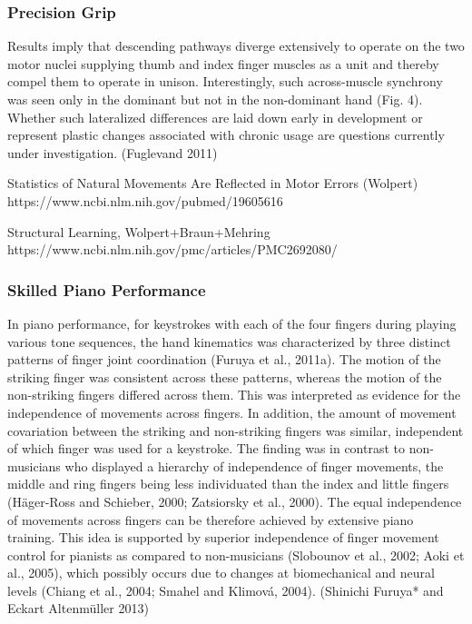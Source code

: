 {            \hypertarget{precision-grip}{%
            \subsubsection{Precision Grip}\label{precision-grip}}

            Results imply that descending pathways diverge extensively
            to operate on the two motor nuclei supplying thumb and index
            finger muscles as a unit and thereby compel them to operate
            in unison. Interestingly, such across-muscle synchrony was
            seen only in the dominant but not in the non-dominant hand
            (Fig. 4). Whether such lateralized differences are laid down
            early in development or represent plastic changes associated
            with chronic usage are questions currently under
            investigation. (Fuglevand 2011)

            Statistics of Natural Movements Are Reflected in Motor
            Errors (Wolpert)
            https://www.ncbi.nlm.nih.gov/pubmed/19605616

            Structural Learning, Wolpert+Braun+Mehring
            https://www.ncbi.nlm.nih.gov/pmc/articles/PMC2692080/

            \hypertarget{skilled-piano-performance}{%
            \subsubsection{Skilled Piano
            Performance}\label{skilled-piano-performance}}

            In piano performance, for keystrokes with each of the four
            fingers during playing various tone sequences, the hand
            kinematics was characterized by three distinct patterns of
            finger joint coordination (Furuya et al., 2011a). The motion
            of the striking finger was consistent across these patterns,
            whereas the motion of the non-striking fingers differed
            across them. This was interpreted as evidence for the
            independence of movements across fingers. In addition, the
            amount of movement covariation between the striking and
            non-striking fingers was similar, independent of which
            finger was used for a keystroke. The finding was in contrast
            to non-musicians who displayed a hierarchy of independence
            of finger movements, the middle and ring fingers being less
            individuated than the index and little fingers (Häger-Ross
            and Schieber, 2000; Zatsiorsky et al., 2000). The equal
            independence of movements across fingers can be therefore
            achieved by extensive piano training. This idea is supported
            by superior independence of finger movement control for
            pianists as compared to non-musicians (Slobounov et al.,
            2002; Aoki et al., 2005), which possibly occurs due to
            changes at biomechanical and neural levels (Chiang et al.,
            2004; Smahel and Klimová, 2004). (Shinichi Furuya* and
            Eckart Altenmüller 2013)

}
